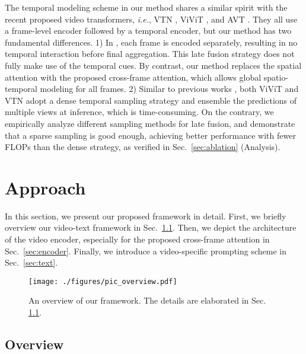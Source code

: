 \documentclass[runningheads]{llncs}
\begin{document}
The temporal modeling scheme in our method shares a similar spirit with the recent proposed video transformers, \emph{i.e.}, VTN \cite{neimark2021VTN}, ViViT \cite{arnab2021vivit}, and AVT \cite{avt}. They all use a frame-level encoder followed by a temporal encoder, but our method has two fundamental differences. 1) In  \cite{neimark2021VTN,arnab2021vivit,avt}, each frame is encoded separately, resulting in no temporal interaction before final aggregation. This late fusion strategy does not fully make use of the temporal cues. By contrast, our method replaces the spatial attention with the proposed cross-frame attention, which allows global spatio-temporal modeling for all frames. 2) Similar to previous works \cite{liu2021video,Fan_2021_ICCV,feichtenhofer2019slowfast,timesformer2021}, both ViViT \cite{arnab2021vivit} and VTN \cite{neimark2021VTN} adopt a dense temporal sampling strategy and ensemble the predictions of multiple views at inference, which is time-consuming. On the contrary, we empirically analyze different sampling methods for late fusion, and demonstrate that a sparse sampling is good enough, achieving better performance with fewer FLOPs than the dense strategy, as verified in Sec.~\ref{sec:ablation} (Analysis). 

\section{Approach}
In this section, we present our proposed framework in detail. First, we briefly overview our video-text framework in Sec.~\ref{sec:overview}. Then, we depict the architecture of the video encoder, especially for the proposed cross-frame attention in Sec.~\ref{sec:encoder}. Finally, we introduce a video-specific prompting scheme in Sec.~\ref{sec:text}.

\begin{figure}[tb!]
\centering
\texttt{[image: ./figures/pic\_overview.pdf]}
\caption{An overview of our framework. The details are elaborated in Sec. \ref{sec:overview}.
}
\label{fig:overview}
\end{figure} 
\subsection{Overview}\label{sec:overview}
\end{document}
